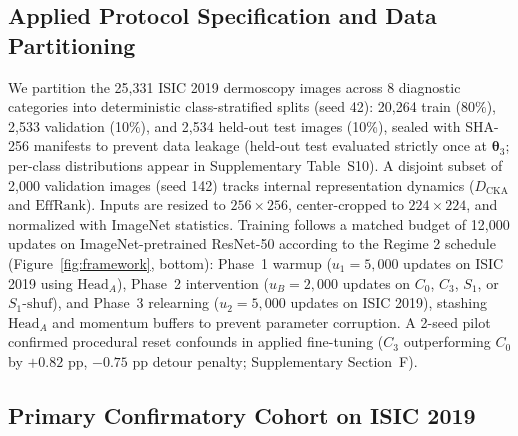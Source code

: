 \documentclass[10pt]{article}
\newcommand{\EffRank}{\mathrm{EffRank}}
\newcommand{\Dcka}{D_{\mathrm{CKA}}}
\begin{document}
\subsection{Applied Protocol Specification and Data Partitioning}\label{subsec:applied_protocol}
We partition the 25,331 ISIC 2019 dermoscopy images across 8 diagnostic categories \cite{codella2018skin,tschandl2018ham10000} into deterministic class-stratified splits (seed 42): 20,264 train (80\%), 2,533 validation (10\%), and 2,534 held-out test images (10\%), sealed with SHA-256 manifests to prevent data leakage (held-out test evaluated strictly once at $\bm{\theta}_3$; per-class distributions appear in Supplementary Table~S10). A disjoint subset of 2,000 validation images (seed 142) tracks internal representation dynamics ($\Dcka$ and $\EffRank$). Inputs are resized to $256 \times 256$, center-cropped to $224 \times 224$, and normalized with ImageNet statistics. Training follows a matched budget of 12,000 updates on ImageNet-pretrained ResNet-50 \cite{he2016deep,wightman2021resnet} according to the Regime 2 schedule (Figure~\ref{fig:framework}, bottom): Phase~1 warmup ($u_1 = 5{,}000$ updates on ISIC 2019 using $\mathrm{Head}_A$), Phase~2 intervention ($u_B = 2{,}000$ updates on $C_0$, $C_3$, $S_1$, or $S_1\text{-shuf}$), and Phase~3 relearning ($u_2 = 5{,}000$ updates on ISIC 2019), stashing $\mathrm{Head}_A$ and momentum buffers to prevent parameter corruption. A 2-seed pilot confirmed procedural reset confounds in applied fine-tuning ($C_3$ outperforming $C_0$ by $+0.82$ pp, $-0.75$ pp detour penalty; Supplementary Section~F).

\subsection{Primary Confirmatory Cohort on ISIC 2019}\label{subsec:applied_confirmatory}

\begin{table}[t]
\caption{Primary confirmatory inferential statistics for applied vision fine-tuning on ISIC 2019 across $N = 8$ independent paired seeds ($12{,}000$ updates, ImageNet-pretrained ResNet-50).}\label{tab:applied_primary_confirmatory}
\centering
{}
\end{table}
\end{document}
